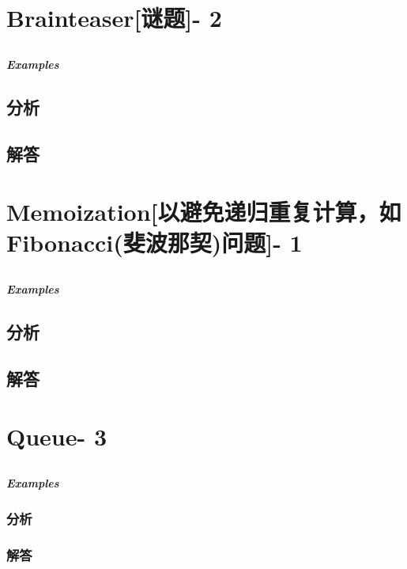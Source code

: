 \documentclass[UTF8,a4paper,12pt]{ctexbook}
\begin{document}
\section{Brainteaser[谜题]- 2}
	\subsection{}
	
	\subparagraph{Examples}
	
	\subsection{分析}
	
	\subsection{解答}
\section{Memoization[以避免递归重复计算，如Fibonacci(斐波那契)问题]- 1}
	\subsection{}
	
	\subparagraph{Examples}
	
	\subsection{分析}
	
	\subsection{解答}

\section{Queue- 3}
	\subsection{}
	
		\subparagraph{Examples}
		
		\subsubsection{分析}
	
		\subsubsection{解答}
	
\end{document}
